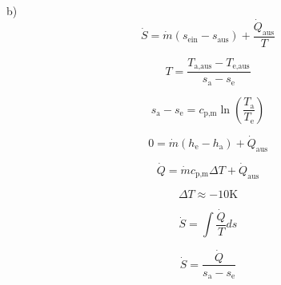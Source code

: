 b) \\
\[
\dot{S} = \dot{m} \left( s_{\text{ein}} - s_{\text{aus}} \right) + \frac{\dot{Q}_{\text{aus}}}{T}
\]

\[
T = \frac{T_{\text{a,aus}} - T_{\text{e,aus}}}{s_{\text{a}} - s_{\text{e}}}
\]

\[
s_{\text{a}} - s_{\text{e}} = c_{\text{p,m}} \ln \left( \frac{T_{\text{a}}}{T_{\text{e}}} \right)
\]

\[
0 = \dot{m} (h_{\text{e}} - h_{\text{a}}) + \dot{Q}_{\text{aus}}
\]

\[
\dot{Q} = \dot{m} c_{\text{p,m}} \Delta T + \dot{Q}_{\text{aus}}
\]

\[
\Delta T \approx -10 \text{K}
\]

\[
\dot{S} = \int \frac{\dot{Q}}{T} ds
\]

\[
\dot{S} = \frac{\dot{Q}}{s_{\text{a}} - s_{\text{e}}}
\]